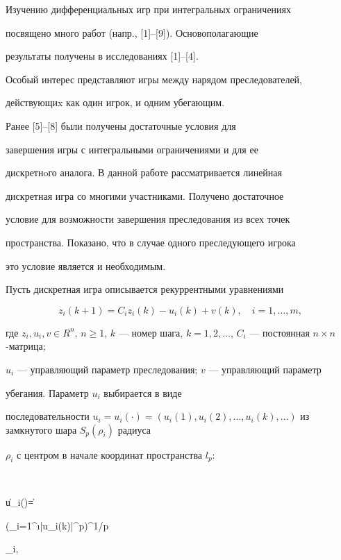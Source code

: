 Изучению дифференциальных игр при интегральных ограничениях


посвящено много работ (напр., [1]--[9]). Основополагающие


результаты получены в исследованиях [1]--[4].


Особый интерес представляют игры между нарядом преследователей,


действующиx как один игрок, и одним убегающим. 


Ранее [5]--[8] были получены достаточные условия для


завершения игры с интегральными ограничениями и для ее


дискретнoго аналога. В данной работе рассматривается линейная


дискретная игра со многими участниками. Получено достаточное


условие для возможности завершения преследования из всех точек


пространства. Показано, что в случае одного преследующего игрока


это условие является и необходимым.





Пусть дискретная игра описывается рекуррентными уравнениями


\begin{equation}


z_i(k+1) = C_iz_i(k) - u_i(k) + v(k), \quad i=1,\dotsc,m,


\end{equation}


где $z_i, u_i, v \in R^n$, $n \geq 1$, $k$ --- номер шага, $k =


1,2,\dotsc$, $C_i$ --- постоянная $n\times n$-матрица; 


$u_i$ --- управляющий параметр преследования; $v$ --- управляющий параметр


убегания. Параметр $u_i$ выбирается в виде


последовательности $u_i=u_i(\cdot)=(u_i(1),u_i(2),\dotsc,


u_i(k),\dotsc)$ из замкнутого шара $S_{p}(\rho_i)$ радиуса


$\rho_i$ с центром в начале координат пространства $l_{p}$:


$$


\|u_i(\cc)\| =


\bigg(\sum\limits_{i=1}^{\i}|u_i(k)|^{p}\bigg)^{1/p} \leq


\rho_i,


